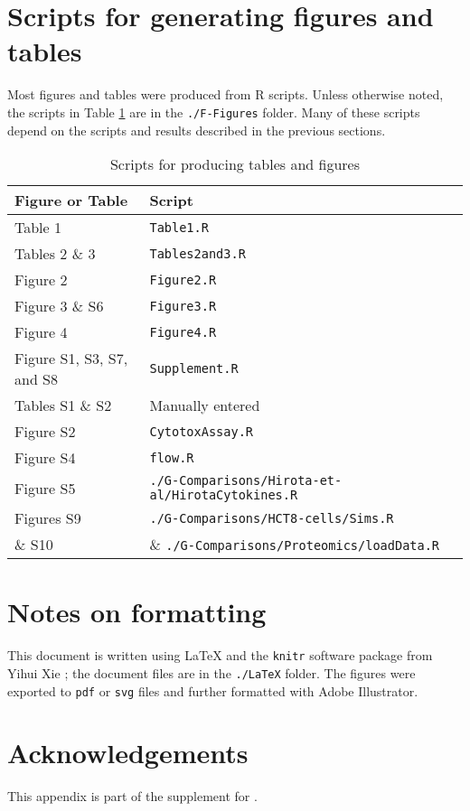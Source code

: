 \section{Scripts for generating figures and tables}\label{S:Figures}

Most figures and tables were produced from R scripts.
Unless otherwise noted, the scripts in Table \ref{Ta:figureScripts} are in the
\texttt{./F-Figures} folder. Many of these scripts depend on the scripts
and results described in the previous sections.

\begin{table}[h]
  \begin{center}
    \begin{tabular}{ l l  }
      Figure or Table   &  Script   \\ \hline
      Table 1 & \texttt{Table1.R} \\
      Tables 2 \& 3 & \texttt{Tables2and3.R} \\
      Figure 2 & \texttt{Figure2.R} \\
      Figure 3 \& S6 & \texttt{Figure3.R} \\
      Figure 4 & \texttt{Figure4.R} \\
      Figure S1, S3, S7, and S8 & \texttt{Supplement.R} \\
      Tables S1 \& S2 & Manually entered \\
      Figure S2 & \texttt{CytotoxAssay.R} \\
      Figure S4 & \texttt{flow.R} \\
      Figure S5 & \texttt{./G-Comparisons/Hirota-et-al/HirotaCytokines.R} \\
      Figures S9 & \texttt{./G-Comparisons/HCT8-cells/Sims.R} \\
      \hspace{1cm} \& S10 & \& \texttt{./G-Comparisons/Proteomics/loadData.R}
    \end{tabular}
    \caption{Scripts for producing tables and figures}\label{Ta:figureScripts}
  \end{center}
\end{table}

\section{Notes on formatting}\label{S:Formatting}

This document is written using \LaTeX{} and the \texttt{knitr} software 
package from Yihui Xie \cite{Xie:2013vq}; the document files are in the \texttt{./LaTeX} folder.
The figures were exported to \texttt{pdf} or \texttt{svg} files and 
further formatted with Adobe Illustrator.

\section{Acknowledgements}
This appendix is part of the supplement for .




